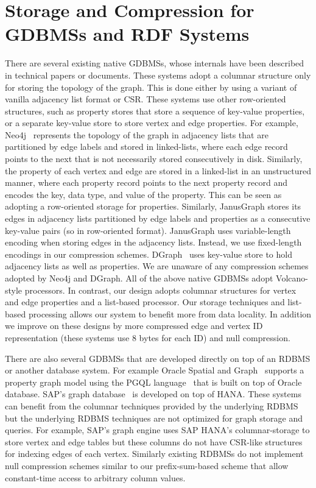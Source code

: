 \section{Storage and Compression for GDBMSs and RDF Systems}
\label{sec:gdbms-storage-and-compression}

There are several existing native GDBMSs, whose internals have been described in technical papers or documents. These systems adopt a columnar structure only for storing the topology of the graph. This is done either by using a variant of vanilla adjacency list format or CSR. These systems use other row-oriented structures, such as property stores that store a sequence of key-value properties, or a separate key-value store to store vertex and edge properties. For example, Neo4j~\cite{neo4j} represents the topology of the graph in adjacency lists that are partitioned by edge labels and stored in linked-lists, where each edge record points to the next that is not necessarily stored consecutively in disk. Similarly, the property of each vertex and edge are stored in a linked-list in an unstructured manner, where each property record points to the next property record and encodes the key, data type, and value of the property. This can be seen as adopting a row-oriented storage for properties. Similarly, JanusGraph \cite{janusgraph} stores its edges in adjacency lists partitioned by edge labels and properties as a consecutive key-value pairs (so in row-oriented format). JanusGraph uses variable-length encoding when storing edges in the adjacency lists. Instead, we use fixed-length encodings in our compression schemes. DGraph~\cite{dgraph} uses key-value store to hold adjacency lists as well as properties.  We are unaware of any compression schemes adopted by Neo4j and DGraph. All of the above native GDBMSs adopt Volcano-style processors. In contrast, our design adopts columnar structures for vertex and edge properties and a list-based processor. Our storage techniques and list-based processing allows our system to benefit more from data locality. In addition we improve on these designs by more compressed edge and vertex ID representation (these systems use 8 bytes for each ID) and null compression.

There are also several GDBMSs that are developed directly on top of an RDBMS or another database system. For example Oracle Spatial and Graph~\cite{oracle} supports a property graph model using the PGQL language~\cite{pgql} that is built on top of Oracle database. SAP's graph database~\cite{hana-graph} is developed on top of HANA. These systems can benefit from the columnar techniques provided by the underlying RDBMS but the underlying RDBMS techniques are not optimized for graph storage and queries. For example, SAP's graph engine uses SAP HANA's columnar-storage to store vertex and edge tables but these columns do not have CSR-like structures for indexing edges of each vertex. Similarly existing RDBMSs do not implement null compression schemes similar to our prefix-sum-based scheme that allow constant-time access to arbitrary column values.

